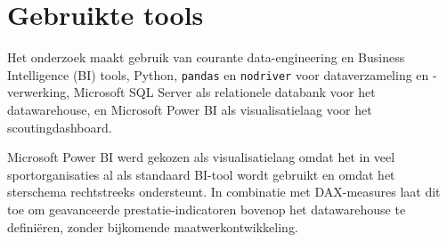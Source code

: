 \section{Gebruikte tools}

Het onderzoek maakt gebruik van courante data-engineering en Business Intelligence (BI) tools, Python, \texttt{pandas} en \texttt{nodriver} voor dataverzameling en -verwerking, Microsoft SQL Server als relationele databank voor het datawarehouse, en Microsoft Power BI als visualisatielaag voor het scoutingdashboard. 

Microsoft Power BI werd gekozen als visualisatielaag omdat het in veel sportorganisaties al als standaard BI-tool wordt gebruikt en omdat het sterschema rechtstreeks ondersteunt. In combinatie met DAX-measures laat dit toe om geavanceerde prestatie-indicatoren bovenop het datawarehouse te definiëren, zonder bijkomende maatwerkontwikkeling.